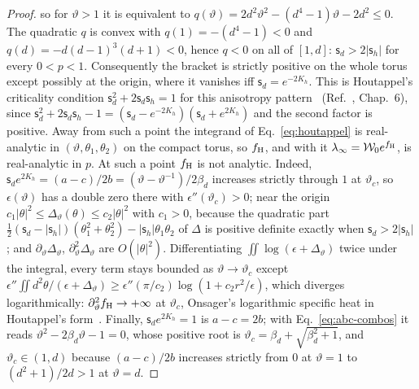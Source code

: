 \documentclass[aps,prx,reprint,superscriptaddress,nobibnotes,longbibliography]{revtex4-2}
\theoremstyle{remark}
\newcommand{\vth}{\vartheta}
\begin{document}
\begin{proof}
so for $\vth>1$ it is equivalent to $q(\vth)=2d^2\vth^2-(d^4-1)\vth-2d^2\le0$.  The quadratic $q$ is convex with $q(1)=-(d^4-1)<0$ and $q(d)=-d(d-1)^3(d+1)<0$, hence $q<0$ on all of $[1,d]$: $\mathsf s_d>2|\mathsf s_h|$ for every $0<p<1$.  Consequently the bracket is strictly positive on the whole torus except possibly at the origin, where it vanishes iff $\mathsf s_d=e^{-2K_h}$.  This is Houtappel's criticality condition $\mathsf s_d^2+2\mathsf s_d\mathsf s_h=1$ for this anisotropy pattern~\cite{Houtappel1950,Bao2020} (Ref.~\cite{Baxter1982}, Chap.~6), since $\mathsf s_d^2+2\mathsf s_d\mathsf s_h-1=(\mathsf s_d-e^{-2K_h})(\mathsf s_d+e^{2K_h})$ and the second factor is positive.  Away from such a point the integrand of Eq.~\eqref{eq:houtappel} is real-analytic in $(\vth,\theta_1,\theta_2)$ on the compact torus, so $f_{\rm H}$, and with it $\lambda_\infty=\mathcal W_0e^{f_{\rm H}}$, is real-analytic in $p$.  At such a point $f_{\rm H}$ is not analytic.  Indeed, $\mathsf s_de^{2K_h}=(a-c)/2b=(\vth-\vth^{-1})/2\beta_d$ increases strictly through $1$ at $\vth_c$, so $\epsilon(\vth)$ has a double zero there with $\epsilon''(\vth_c)>0$; near the origin $c_1|\theta|^2\le\Delta_\vth(\theta)\le c_2|\theta|^2$ with $c_1>0$, because the quadratic part $\frac12(\mathsf s_d-|\mathsf s_h|)(\theta_1^2+\theta_2^2)-|\mathsf s_h|\theta_1\theta_2$ of $\Delta$ is positive definite exactly when $\mathsf s_d>2|\mathsf s_h|$; and $\partial_\vth\Delta_\vth$, $\partial_\vth^2\Delta_\vth$ are $O(|\theta|^2)$.  Differentiating $\iint\log(\epsilon+\Delta_\vth)$ twice under the integral, every term stays bounded as $\vth\to\vth_c$ except $\epsilon''\iint d^2\theta/(\epsilon+\Delta_\vth)\ge\epsilon''(\pi/c_2)\log(1+c_2r^2/\epsilon)$, which diverges logarithmically: $\partial_\vth^2f_{\rm H}\to+\infty$ at $\vth_c$, Onsager's logarithmic specific heat in Houtappel's form~\cite{Houtappel1950}.  Finally, $\mathsf s_de^{2K_h}=1$ is $a-c=2b$; with Eq.~\eqref{eq:abc-combos} it reads $\vth^2-2\beta_d\vth-1=0$, whose positive root is $\vth_c=\beta_d+\sqrt{\beta_d^2+1}$, and $\vth_c\in(1,d)$ because $(a-c)/2b$ increases strictly from $0$ at $\vth=1$ to $(d^2+1)/2d>1$ at $\vth=d$.


\end{proof}
\end{document}
